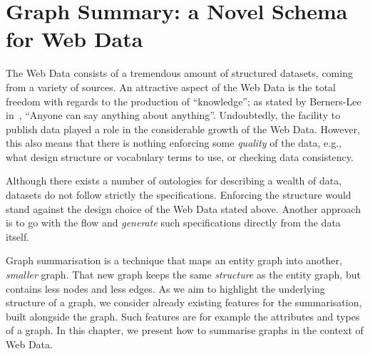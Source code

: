 \chapter{Graph Summary: a Novel Schema for Web Data}
\label{chap:summary}

The Web Data consists of a tremendous amount of structured datasets, coming from a variety of sources. An attractive aspect of the Web Data is the total freedom with regards to the production of ``knowledge''; as stated by Berners-Lee in~\cite{tbl:1997:wam}, ``Anyone can say anything about anything''. Undoubtedly, the facility to publish data played a role in the considerable growth of the Web Data. However, this also means that there is nothing enforcing some \emph{quality} of the data, e.g., what design structure or vocabulary terms to use, or checking data consistency.

Although there exists a number of ontologies for describing a wealth of data, datasets do not follow strictly the specifications. Enforcing the structure would stand against the design choice of the Web Data stated above. Another approach is to go with the flow and \emph{generate} such specifications directly from the data itself.

Graph summarisation is a technique that maps an entity graph into another, \emph{smaller} graph. That new graph keeps the same \emph{structure} as the entity graph, but contains less nodes and less edges. %
As we aim to highlight the underlying structure of a graph, we consider already existing features for the summarisation, built alongside the graph. Such features are for example the \gls{attributes} and \gls{types} of a graph.
In this chapter, we present how to summarise graphs in the context of Web Data.
